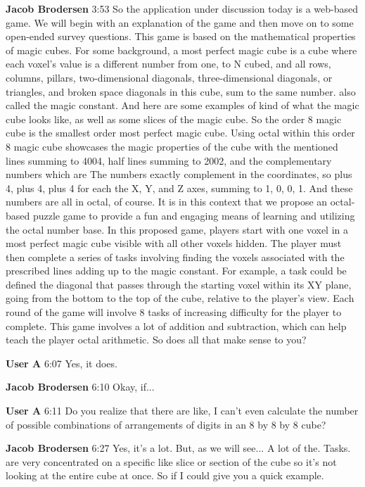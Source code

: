 \documentclass{article}
\begin{document}
\noindent \textbf{Jacob Brodersen}   3:53
So the application under discussion today is a web-based game. We will begin with an explanation of the game and then move on to some open-ended survey questions. This game is based on the mathematical properties of magic cubes. For some background, a most perfect magic cube is a cube where each voxel's value is a different number from one,
to N cubed, and all rows, columns, pillars, two-dimensional diagonals, three-dimensional diagonals, or triangles, and broken space diagonals in this cube, sum to the same number.
also called the magic constant. And here are some examples of kind of what the magic cube looks like, as well as some slices of the magic cube.
So the order 8 magic cube is the smallest order most perfect magic cube. Using octal within this order 8 magic cube showcases the magic properties of the cube with the mentioned lines summing to 4004, half lines summing to 2002, and the complementary numbers which are
The numbers exactly complement in the coordinates, so plus 4, plus 4, plus 4 for each the X, Y, and Z axes, summing to 1, 0, 0, 1. And these numbers are all in octal, of course.
It is in this context that we propose an octal-based puzzle game to provide a fun and engaging means of learning and utilizing the octal number base. In this proposed game, players start with one voxel in a most perfect magic cube visible with all other voxels hidden. The player must then complete a series of tasks involving finding the voxels associated with the prescribed lines
adding up to the magic constant.
For example, a task could be defined the diagonal that passes through the starting voxel within its XY plane, going from the bottom to the top of the cube, relative to the player's view. Each round of the game will involve 8 tasks of increasing difficulty for the player to complete. This game involves a lot of addition and subtraction,
which can help teach the player octal arithmetic. So does all that make sense to you?

\noindent \textbf{User A}   6:07
Yes, it does.

\noindent \textbf{Jacob Brodersen}   6:10
Okay, if...

\noindent \textbf{User A}   6:11
Do you realize that there are like, I can't even calculate the number of possible combinations of arrangements of digits in an 8 by 8 by 8 cube?

\noindent \textbf{Jacob Brodersen}   6:27
Yes, it's a lot.
But, as we will see...
A lot of the.
Tasks.
are very concentrated on a specific like slice or section of the cube so it's not looking at the entire cube at once. So if I could give you a quick example.
\end{document}
